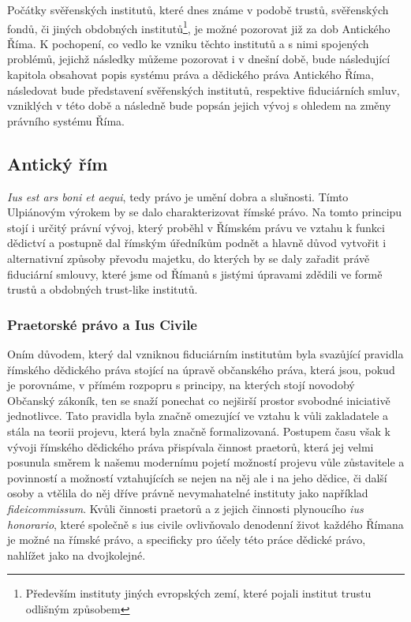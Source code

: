 \documentclass{article}
\begin{document}
Počátky svěřenských institutů, které dnes známe v podobě trustů, svěřenských fondů, či jiných obdobných institutů\footnote{Především instituty jiných evropských zemí, které pojali institut trustu odlišným způsobem}, je možné pozorovat již za dob Antického Říma. K pochopení, co vedlo ke vzniku těchto institutů a s nimi spojených problémů, jejichž následky můžeme pozorovat i v dnešní době, bude následující kapitola obsahovat popis systému práva a dědického práva Antického Říma, následovat bude představení svěřenských institutů, respektive fiduciárních smluv, vzniklých v této době a následně bude popsán jejich vývoj s ohledem na změny právního systému Říma.

\subsection{Antický řím}

\textit{Ius est ars boni et aequi}, tedy právo je umění dobra a slušnosti. Tímto Ulpiánovým výrokem by se dalo charakterizovat římské právo. Na tomto principu stojí i určitý právní vývoj, který proběhl v Římském právu ve vztahu k funkci dědictví a postupně dal římským úředníkům podnět a hlavně důvod vytvořit i alternativní způsoby převodu majetku, do kterých by se daly zařadit právě fiduciární smlouvy, které jsme od Římanů s jistými úpravami zdědili ve formě trustů a obdobných trust-like institutů.%

\subsubsection{Praetorské právo a Ius Civile}

Oním důvodem, který dal vzniknou fiduciárním institutům byla svazůjící pravidla římského dědického práva stojící na úpravě občanského práva, která jsou, pokud je porovnáme, v přímém rozpopru s principy, na kterých stojí novodobý Občanský zákoník, ten se snaží ponechat co nejširší prostor svobodné iniciativě jednotlivce. Tato pravidla byla značně omezující ve vztahu k vůli zakladatele a stála na teorii projevu, která byla značně formalizovaná. Postupem času však k vývoji římského dědického práva přispívala činnost praetorů, která jej velmi posunula směrem k našemu modernímu pojetí možností projevu vůle zůstavitele a povinností a možností vztahujících se nejen na něj ale i na jeho dědice, či další osoby a vtělila do něj dříve právně nevymahatelné instituty jako například \textit{fideicommissum}. Kvůli činnosti praetorů a z jejich činnosti plynoucího \textit{ius honorario}, které společně s {ius civile} ovlivňovalo denodenní život každého Římana je možné na římské právo, a specificky pro účely této práce dědické právo, nahlížet jako na dvojkolejné.\\
\end{document}
